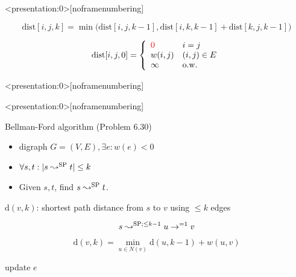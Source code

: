 
\begin{frame}<presentation:0>[noframenumbering]
  \centerline{}

  \[
    \text{dist}[i,j,k] = \min \Big(\text{dist}[i,j,k-1], \text{dist}[i,k,k-1] + \text{dist}[k,j,k-1]\Big)
  \]


  \[
    \text{dist}[i,j,0] = \left\{\begin{array}{ll}
      \textcolor{red}{0} & i = j \\
      w(i,j) & (i,j) \in E \\
      \infty & \text{o.w.}
    \end{array} \right.
  \]
\end{frame}

\begin{frame}<presentation:0>[noframenumbering]
  
\end{frame}

\begin{frame}<presentation:0>[noframenumbering]
  \begin{exampleblock}{Bellman-Ford algorithm (Problem 6.30)}
    \begin{itemize}
      \item digraph $G = (V, E), \exists e: w(e) < 0$
      \item $\forall s, t: |s \leadsto^{\text{SP}} t| \le k$
      \item Given $s,t$, find $s \leadsto^{\text{SP}} t$.
    \end{itemize}
  \end{exampleblock}

  $\text{d}(v,k)$: shortest path distance from $s$ to $v$ using $\le k$ edges

  \[
    s \leadsto^{\text{SP}; \le k-1} u \to^{=1} v
  \]

  \[
    \text{d}(v, k) = \min_{u \in N(v)} \text{d}(u, k-1) + w(u,v)
  \]

  \begin{center}
    \begin{minipage}{0.50\linewidth}
      \begin{algorithmic}[c]
		\State update $e$
	  \EndFor
	\EndFor
      \end{algorithmic}
    \end{minipage}
  \end{center}
\end{frame}

